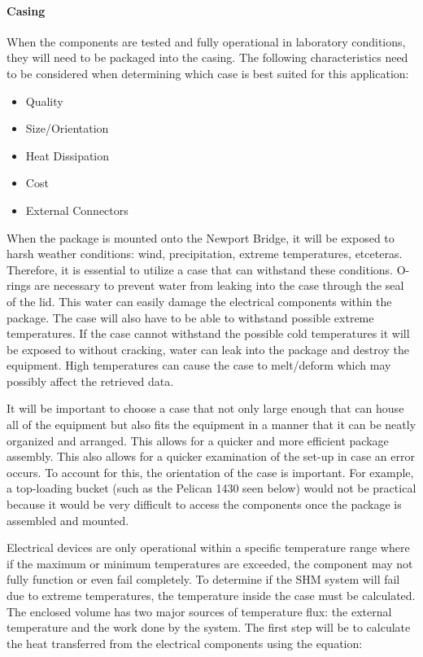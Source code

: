 \paragraph{Casing}

When the components are tested and fully operational in laboratory conditions, they will need to be packaged into the casing.  The following
characteristics need to be considered when determining which case is best suited for this application:

\begin{itemize}
\item {Quality} 
\item {Size/Orientation}
\item {Heat Dissipation} 
\item {Cost} 
\item {External Connectors}
\end{itemize}


When the package is mounted onto the Newport Bridge, it will be exposed to harsh weather conditions: wind, precipitation, extreme temperatures,
etceteras.  Therefore, it is essential to utilize a case that can withstand these conditions.  O-rings are necessary to prevent water from leaking into
the case through the seal of the lid.  This water can easily damage the electrical components within the package.  The case will also have to be able to
withstand possible extreme temperatures.  If the case cannot withstand the possible cold temperatures it will be exposed to without cracking, water can
leak into the package and destroy the equipment.  High temperatures can cause the case to melt/deform which may possibly affect the retrieved data.  

It will be important to choose a case that not only large enough that can house all of the equipment but also fits the equipment in a manner that it can
be neatly organized and arranged.  This allows for a quicker and more efficient package assembly.  This also allows for a quicker examination of the
set-up in case an error occurs.  To account for this, the orientation of the case is important.  For example, a top-loading bucket (such as the Pelican
1430 seen below) would not be practical because it would be very difficult to access the components once the package is assembled and mounted.   



Electrical devices are only operational within a specific temperature range where if the maximum or minimum temperatures are exceeded, the component may
not fully function or even fail completely.  To determine if the SHM system will fail due to extreme temperatures, the temperature inside the case must
be calculated.  The enclosed volume has two major sources of temperature flux: the external temperature and the work done by the system.  The first step
will be to calculate the heat transferred from the electrical components using the equation:

